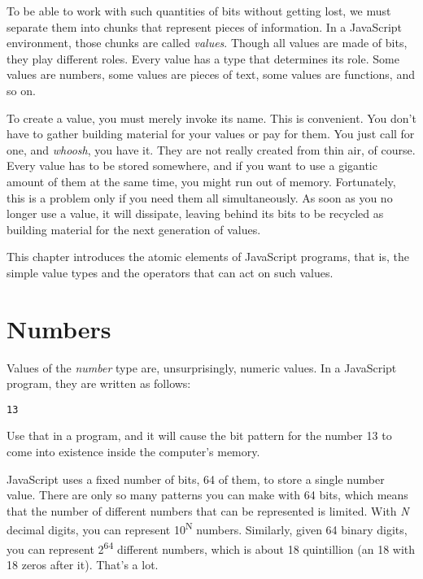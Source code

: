 To be able to work with such quantities of bits without getting lost, we must separate them into chunks that represent pieces of information. In a JavaScript environment, those chunks are called \emph{values}. Though all values are made of bits, they play different roles. Every value has a type that determines its role. Some values are numbers, some values are pieces of text, some values are functions, and so on.

To create a value, you must merely invoke its name. This is convenient. You don't have to gather building material for your values or pay for them. You just call for one, and \emph{whoosh}, you have it. They are not really created from thin air, of course. Every value has to be stored somewhere, and if you want to use a gigantic amount of them at the same time, you might run out of memory. Fortunately, this is a problem only if you need them all simultaneously. As soon as you no longer use a value, it will dissipate, leaving behind its bits to be recycled as building material for the next generation of values.

This chapter introduces the atomic elements of JavaScript programs, that is, the simple value types and the operators that can act on such values.

\section{Numbers}

Values of the \emph{number} type are, unsurprisingly, numeric values. In a JavaScript program, they are written as follows:

\begin{lstlisting}
13
\end{lstlisting}
\noindent{}

Use that in a program, and it will cause the bit pattern for the number 13 to come into existence inside the computer's memory.

JavaScript uses a fixed number of bits, 64 of them, to store a single number value. There are only so many patterns you can make with 64 bits, which means that the number of different numbers that can be represented is limited. With \emph{N} decimal digits, you can represent 10\textsuperscript{N} numbers. Similarly, given 64 binary digits, you can represent 2\textsuperscript{64} different numbers, which is about 18 quintillion (an 18 with 18 zeros after it). That's a lot.

